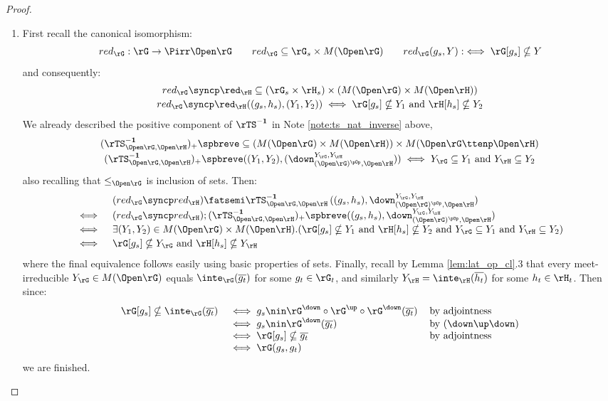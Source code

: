 \documentclass{article}
\begin{document}
\begin{proof}
\begin{enumerate}
\item
First recall the canonical isomorphism:
\[
red_\rG : \rG \to \Pirr\Open\rG
\qquad
red_\rG \subseteq \rG_s \times M(\Open\rG)
\qquad
red_\rG(g_s,Y) :\iff \rG[g_s] \nsubseteq Y
\]
and consequently:
\[
\begin{tabular}{c}
$red_\rG \syncp \red_\rH \subseteq (\rG_s \times \rH_s) \times (M(\Open\rG) \times M(\Open\rH))$
\\[0.5ex]
$red_\rG \syncp \red_\rH((g_s,h_s),(Y_1,Y_2)) \iff \rG[g_s] \nsubseteq Y_1 \text{ and } \rH[h_s] \nsubseteq Y_2$
\end{tabular}
\]
We already described the positive component of $\rTS^{\bf-1}$ in Note \ref{note:ts_nat_inverse} above,
\[
\begin{tabular}{c}
$(\rTS_{\Open\rG,\Open\rH}^{\bf-1})_+\spbreve \subseteq (M(\Open\rG) \times M(\Open\rH)) \times M(\Open\rG \ttenp \Open\rH)$
\\[0.5ex]
$(\rTS_{\Open\rG,\Open\rH}^{\bf-1})_+\spbreve((Y_1,Y_2),(\down_{(\Open\rG)^{\pOp},\Open\rH}^{Y_\rG,Y_\rH}))
\iff Y_\rG \subseteq Y_1 \text{ and } Y_\rH \subseteq Y_2$
\end{tabular}
\]
also recalling that $\leq_{\Open\rG}$ is inclusion of sets. Then:
\[
\begin{tabular}{lll}
& $(red_\rG \syncp red_\rH) \fatsemi \rTS_{\Open\rG,\Open\rH}^{\bf-1} \, ((g_s,h_s),\down_{(\Open\rG)^{\pOp},\Open\rH}^{Y_\rG, Y_\rH})$
\\[0.5ex] $\iff$ &
$(red_\rG \syncp red_\rH) ; (\rTS_{\Open\rG,\Open\rH}^{\bf-1})_+\spbreve ((g_s,h_s),\down_{(\Open\rG)^{\pOp},\Open\rH}^{Y_\rG, Y_\rH})$
\\[0.5ex] $\iff$ &
$\exists (Y_1,Y_2) \in M(\Open\rG) \times M(\Open\rH).(\rG[g_s] \nsubseteq Y_1 \text{ and } \rH[h_s] \nsubseteq Y_2 \text{ and } Y_\rG \subseteq Y_1 \text{ and } Y_\rH \subseteq Y_2 )$
\\[0.5ex] $\iff$ &
$\rG[g_s] \nsubseteq Y_\rG \text{ and } \rH[h_s] \nsubseteq Y_\rH$
\end{tabular}
\]
where the final equivalence follows easily using basic properties of sets. Finally, recall by Lemma \ref{lem:lat_op_cl}.3 that every meet-irreducible $Y_\rG \in M(\Open\rG)$ equals $\inte_\rG(\overline{g_t})$ for some $g_t \in \rG_t$, and similarly $Y_\rH = \inte_\rH(\overline{h_t})$ for some $h_t \in \rH_t$. Then since:
\[
\begin{tabular}{lll}
$\rG[g_s] \nsubseteq \inte_\rG(\overline{g_t})$
&
$\iff g_s \nin \rG^\down \circ \rG^\up \circ \rG^\down(\overline{g_t})$
& by adjointness
\\&
$\iff g_s \nin \rG^\down(\overline{g_t})$
& by $(\down\up\down)$
\\&
$\iff \rG[g_s] \nsubseteq \overline{g_t}$
& by adjointness
\\&
$\iff \rG(g_s,g_t)$
\end{tabular}
\]
we are finished.

\end{enumerate}
\end{proof}
\end{document}
